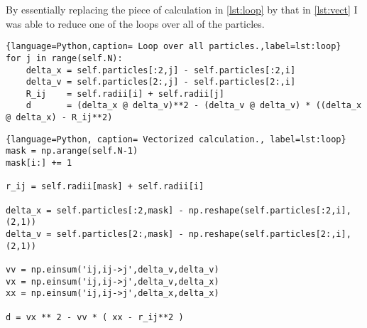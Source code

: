 By essentially replacing the piece of calculation in \ref{lst:loop} by that in \ref{lst:vect} I was able to reduce one of the loops over all of the particles.

\begin{lstlisting}{language=Python,caption= Loop over all particles.,label=lst:loop}
for j in range(self.N):
	delta_x = self.particles[:2,j] - self.particles[:2,i]
	delta_v = self.particles[2:,j] - self.particles[2:,i]
	R_ij    = self.radii[i] + self.radii[j]
	d       = (delta_x @ delta_v)**2 - (delta_v @ delta_v) * ((delta_x @ delta_x) - R_ij**2)
\end{lstlisting}

\begin{lstlisting}{language=Python, caption= Vectorized calculation., label=lst:loop}
mask = np.arange(self.N-1)
mask[i:] += 1

r_ij = self.radii[mask] + self.radii[i]

delta_x = self.particles[:2,mask] - np.reshape(self.particles[:2,i],(2,1))
delta_v = self.particles[2:,mask] - np.reshape(self.particles[2:,i],(2,1))

vv = np.einsum('ij,ij->j',delta_v,delta_v)
vx = np.einsum('ij,ij->j',delta_v,delta_x)
xx = np.einsum('ij,ij->j',delta_x,delta_x)

d = vx ** 2 - vv * ( xx - r_ij**2 )
\end{lstlisting}